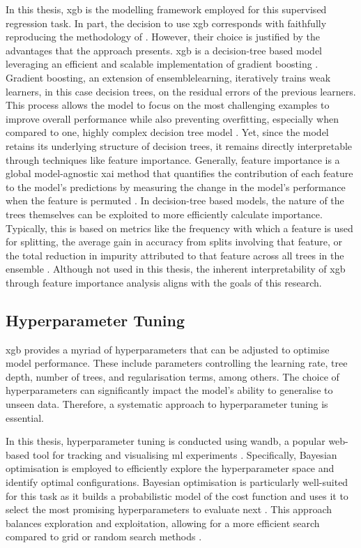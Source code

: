 In this thesis, \acrfull{xgb} is the modelling framework employed for this supervised regression task. In part, the decision to use \acrshort{xgb} corresponds with faithfully reproducing the methodology of \cite{Hunt2024}. However, their choice is justified by the advantages that the approach presents. \acrshort{xgb} is a decision-tree based model leveraging an efficient and scalable implementation of gradient boosting \citep{Chen2016}. Gradient boosting, an extension of \gls{ensemblelearning}, iteratively trains weak learners, in this case decision trees, on the residual errors of the previous learners. This process allows the model to focus on the most challenging examples to improve overall performance while also preventing overfitting, especially when compared to one, highly complex decision tree model \citep{Friedman2001}. Yet, since the model retains its underlying structure of decision trees, it remains directly interpretable through techniques like feature importance. Generally, feature importance is a global model-agnostic \acrshort{xai} method that quantifies the contribution of each feature to the model's predictions by measuring the change in the model's performance when the feature is permuted \citep{Musolf2022}. In decision-tree based models, the nature of the trees themselves can be exploited to more efficiently calculate importance. Typically, this is based on metrics like the frequency with which a feature is used for splitting, the average gain in accuracy from splits involving that feature, or the total reduction in impurity attributed to that feature across all trees in the ensemble \citep{Louppe2013}. Although not used in this thesis, the inherent interpretability of \acrshort{xgb} through feature importance analysis aligns with the goals of this research.

\subsection{Hyperparameter Tuning}

\acrshort{xgb} provides a myriad of hyperparameters that can be adjusted to optimise model performance. These include parameters controlling the learning rate, tree depth, number of trees, and regularisation terms, among others. The choice of hyperparameters can significantly impact the model's ability to generalise to unseen data. Therefore, a systematic approach to hyperparameter tuning is essential. 

In this thesis, hyperparameter tuning is conducted using \acrfull{wandb}, a popular web-based tool for tracking and visualising \acrshort{ml} experiments . Specifically, Bayesian optimisation is employed to efficiently explore the hyperparameter space and identify optimal configurations. Bayesian optimisation is particularly well-suited for this task as it builds a probabilistic model of the cost function and uses it to select the most promising hyperparameters to evaluate next . This approach balances exploration and exploitation, allowing for a more efficient search compared to grid or random search methods . 

